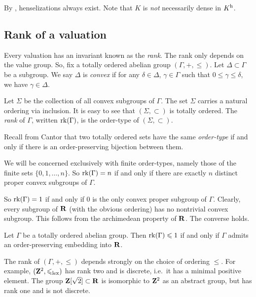 By \cite[5.2.2]{engler-prestel}, henselizations always exist. Note that $K$ is 
\emph{not} necessarily dense in $K^{\mathrm{h}}$. 



\subsection{Rank of a valuation}

Every valuation has an invariant known as the \emph{rank}. The rank only 
depends on the value group. So, fix a totally ordered abelian group 
$(\Gamma,+,\leqslant)$. Let $\Delta\subset \Gamma$ be a subgroup. We say 
$\Delta$ is \emph{convex} if for any $\delta\in \Delta$, $\gamma\in \Gamma$ 
such that $0\leqslant \gamma\leqslant \delta$, we have $\gamma\in \Delta$. 

Let $\Sigma$ be the collection of all convex subgroups of $\Gamma$. The set 
$\Sigma$ carries a natural ordering via inclusion. It is easy to see that 
$(\Sigma,\subset)$ is totally ordered. The \emph{rank} of $\Gamma$, written 
$\operatorname{rk}(\Gamma)$, is the order-type of $(\Sigma,\subset)$. 

Recall from Cantor that two totally ordered sets have the same 
\emph{order-type} if and only if there is an order-preserving bijection between 
them. 

We will be concerned exclusively with finite order-types, namely those of 
the finite sets $\{0,1,\dots,n\}$. So $\operatorname{rk}(\Gamma)=n$ if and only if there 
are exactly $n$ distinct proper convex subgroups of $\Gamma$. 

So $\operatorname{rk}(\Gamma)=1$ if and only if $0$ is the only convex proper subgroup of 
$\Gamma$. Clearly, every subgroup of $\mathbf{R}$ (with the obvious ordering) has no 
nontrivial convex subgroup. This follows from the archimedean property of 
$\mathbf{R}$. The converse holds. 

\begin{theorem}
Let $\Gamma$ be a totally ordered abelian group. Then
$\operatorname{rk}(\Gamma)\leqslant 1$ if and only if $\Gamma$ admits an order-preserving 
embedding into $\mathbf{R}$. 
\end{theorem}

The rank of $(\Gamma,+,\leqslant)$ depends strongly on the choice of ordering 
$\leqslant$. For example, $(\mathbf{Z}^2,\leqslant_\mathrm{lex})$ has rank two and is 
discrete, i.e.~it has a minimal positive element. The group 
$\mathbf{Z}[\sqrt{2}]\subset \mathbf{R}$ is isomorphic to $\mathbf{Z}^2$ as an abstract group, but 
has rank one and is not discrete. 





